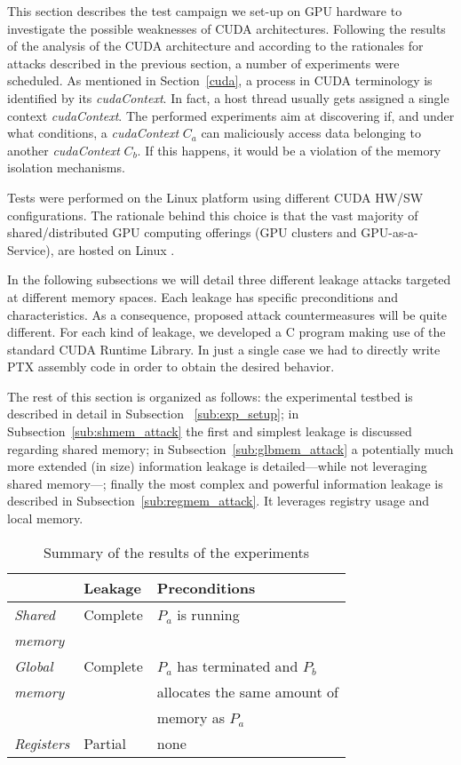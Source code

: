 \documentclass[11pt,onecolumn,letterpaper]{IEEEtran}
\begin{document}
This section describes the test campaign we set-up on GPU hardware to investigate the possible weaknesses of CUDA architectures.
Following the results of the analysis of the CUDA architecture and according to the rationales for attacks described in the previous section,
a number of experiments were scheduled.
As mentioned in Section~\ref{cuda}, a process in CUDA terminology is identified by its \emph{cudaContext}.
In fact, a host thread  usually gets assigned a single context \emph{cudaContext}.
The performed experiments aim at discovering if, and under what conditions,
a \emph{cudaContext} $C_a$  can maliciously access data belonging to another \emph{cudaContext} $C_b$.
If this happens, it would be a violation of the memory isolation mechanisms.

Tests were performed on the Linux platform using different CUDA HW/SW configurations.
The rationale behind this choice is that the vast majority of shared/distributed GPU computing offerings (GPU clusters and GPU-as-a-Service), are hosted on Linux \cite{linuxinthecloud}.

In the following subsections we will detail three different leakage attacks targeted at different memory spaces.
Each leakage has specific preconditions and characteristics.
As a consequence, proposed attack countermeasures will be quite different.
For each kind of leakage, we developed a C program making use of the standard CUDA Runtime Library.
In just a single case we had to directly write PTX assembly code in order to obtain the desired behavior.

The rest of this section is organized as follows: the experimental testbed is described in detail in Subsection ~\ref{sub:exp_setup};
in Subsection~\ref{sub:shmem_attack} the first and simplest leakage is discussed regarding shared memory;
in Subsection~\ref{sub:glbmem_attack} a potentially much more extended (in size) information leakage is detailed---while not leveraging shared memory---;
finally the most complex and powerful information leakage is described in Subsection~\ref{sub:regmem_attack}.
It leverages registry usage and local memory.

\begin{center}
\begin{table}
	\centering
	\caption{Summary of the results of the experiments}
\begin{tabular}{| l | l | l |}
		\hline 
		& \textbf{Leakage} & \textbf{Preconditions} \\
		\hline \hline
		\textit{Shared} & Complete & $P_a$ is running \\
		\textit{memory} &  &   \\\hline
		\textit{Global} & Complete  & $P_a$ has terminated and $P_b$  \\
		\textit{memory}	&           & allocates the same amount of\\
				&	    &  memory as $P_a$ \\\hline
		\textit{Registers} & Partial & none \\\hline	 	 	
	\end{tabular}
	\smallskip
	\smallskip
\label{tab:test-summary}
\end{table}
\end{center}
\end{document}
